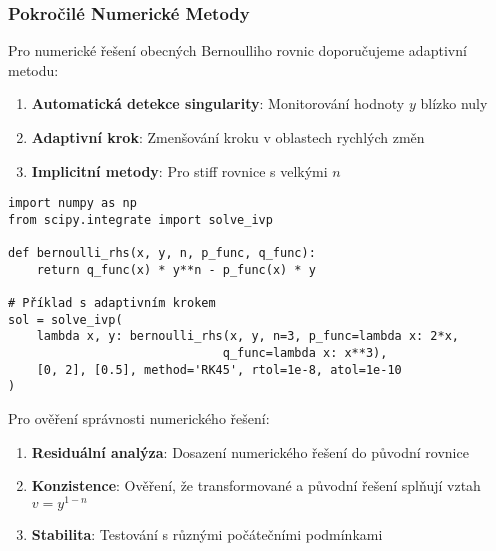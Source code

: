 \vspace{0.8\baselineskip}

\subsubsection{Pokročilé Numerické Metody}
\label{subsubsec:numericke-metody}

\begin{method}
\label{met:adaptive-runge-kutta}
Pro numerické řešení obecných Bernoulliho rovnic doporučujeme adaptivní metodu:

\begin{enumerate}
\item \textbf{Automatická detekce singularity}: Monitorování hodnoty $y$ blízko nuly
\item \textbf{Adaptivní krok}: Zmenšování kroku v oblastech rychlých změn
\item \textbf{Implicitní metody}: Pro stiff rovnice s velkými $n$
\end{enumerate}

\begin{verbatim}
import numpy as np
from scipy.integrate import solve_ivp

def bernoulli_rhs(x, y, n, p_func, q_func):
    return q_func(x) * y**n - p_func(x) * y

# Příklad s adaptivním krokem
sol = solve_ivp(
    lambda x, y: bernoulli_rhs(x, y, n=3, p_func=lambda x: 2*x, 
                              q_func=lambda x: x**3),
    [0, 2], [0.5], method='RK45', rtol=1e-8, atol=1e-10
)
\end{verbatim}
\end{method}

\vspace{0.6\baselineskip}

\begin{method}
\label{met:analyza-chyb}
Pro ověření správnosti numerického řešení:

\begin{enumerate}
\item \textbf{Residuální analýza}: Dosazení numerického řešení do původní rovnice
\item \textbf{Konzistence}: Ověření, že transformované a původní řešení splňují vztah $v = y^{1-n}$
\item \textbf{Stabilita}: Testování s různými počátečními podmínkami
\end{enumerate}
\end{method}

